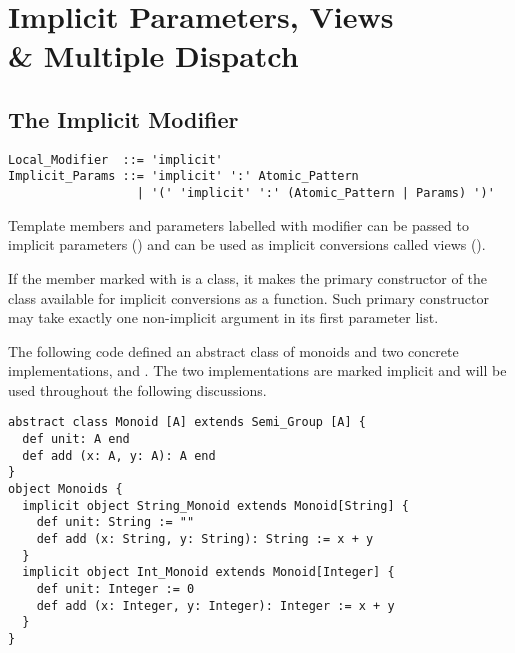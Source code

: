
\chapter[Implicit Parameters, Views \& Multiple Dispatch]{Implicit Parameters, Views \\\& Multiple Dispatch}
\label{sec:implicit-params-views}
\label{sec:implicits}

\minitoc

\newpage





\section{The Implicit Modifier}
\label{sec:implicit-modifier}

\grammar\begin{lstlisting}
Local_Modifier  ::= 'implicit'
Implicit_Params ::= 'implicit' ':' Atomic_Pattern
                  | '(' 'implicit' ':' (Atomic_Pattern | Params) ')'
\end{lstlisting}

Template members and parameters labelled with  modifier can be passed to implicit parameters () and can be used as implicit conversions called views (). 

If the member marked with  is a class, it makes the primary constructor of the class available for implicit conversions as a function. Such primary constructor may take exactly one non-implicit argument in its first parameter list. 

\example\label{ex:impl-monoid} The following code defined an abstract class of monoids and two concrete implementations,  and . The two implementations are marked implicit and will be used throughout the following discussions. 
\begin{lstlisting}
abstract class Monoid [A] extends Semi_Group [A] {
  def unit: A end
  def add (x: A, y: A): A end
}
object Monoids {
  implicit object String_Monoid extends Monoid[String] {
    def unit: String := ""
    def add (x: String, y: String): String := x + y
  }
  implicit object Int_Monoid extends Monoid[Integer] {
    def unit: Integer := 0
    def add (x: Integer, y: Integer): Integer := x + y
  }
}
\end{lstlisting}






